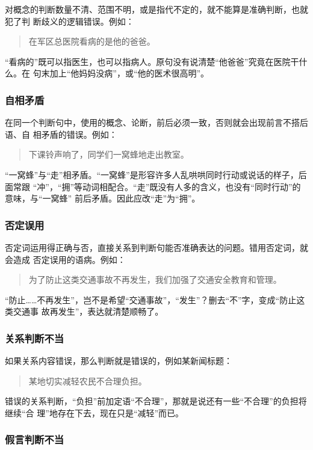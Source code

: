 \documentclass[final,oneside]{ctexbook}
\newenvironment{equotation}{\begin{quotation}\kaishu}{\end{quotation}}
\begin{document}
对概念的判断数量不清、范围不明，或是指代不定的，就不能算是准确判断，也就犯了判
断歧义的逻辑错误。例如：
\begin{equotation}
  在军区总医院看病的是他的爸爸。
\end{equotation}
“看病的”既可以指医生，也可以指病人。原句没有说清楚“他爸爸”究竟在医院干什么。在
句末加上“他妈妈没病”，或“他的医术很高明”。

\subsubsection{自相矛盾}

在同一个判断句中，使用的概念、论断，前后必须一致，否则就会出现前言不搭后语、自
相矛盾的错误。例如：
\begin{equotation}
  下课铃声响了，同学们一窝蜂地走出教室。
\end{equotation}
“一窝蜂”与“走”相矛盾。“一窝蜂”是形容许多人乱哄哄同时行动或说话的样子，后面常跟
“冲”，“拥”等动词相配合。“走”既没有人多的含义，也没有“同时行动”的意味，与“一窝蜂”
前后矛盾。因此应改“走”为“拥”。

\subsubsection{否定误用}

否定词运用得正确与否，直接关系到判断句能否准确表达的问题。错用否定词，就会造成
否定误用的语病。例如：
\begin{equotation}
  为了防止这类交通事故不再发生，我们加强了交通安全教育和管理。
\end{equotation}
“防止……不再发生”，岂不是希望“交通事故”，“发生”？删去“不”字，变成“防止这类交通事
故再发生”，表达就清楚顺畅了。

\subsubsection{关系判断不当}

如果关系内容错误，那么判断就是错误的，例如某新闻标题：
\begin{equotation}
  某地切实减轻农民不合理负担。
\end{equotation}
错误的关系判断，“负担”前加定语“不合理”，那就是说还有一些“不合理”的负担将继续“合
理”地存在下去，现在只是“减轻”而已。

\subsubsection{假言判断不当}
\end{document}
